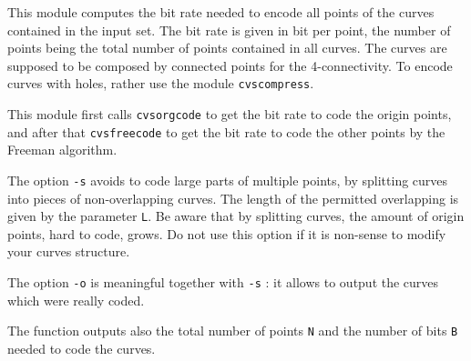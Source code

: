 This module computes the bit rate needed to encode
all points of the curves contained in the input set.
The bit rate is given in bit per point, the number of points being
the total number of points contained in all curves.
The curves are supposed to be composed by connected points
for the 4-connectivity. To encode curves with holes, rather use
the module \verb+cvscompress+.

This module first calls \verb+cvsorgcode+ to get the 
bit rate to code the origin points, and after that
\verb+cvsfreecode+ to get the bit rate to code the other points
by the Freeman algorithm.

The option \verb+-s+ avoids to code large parts of multiple points,
by splitting curves into pieces of non-overlapping curves.
The length of the permitted overlapping is given by the parameter
\verb+L+. 
Be aware that by splitting curves, the amount of origin points,
hard to code, grows.
Do not use this option if it is non-sense to modify your curves 
structure.

The option \verb+-o+ is meaningful together with \verb+-s+ : it
allows to output the curves which were really coded.

The function outputs also the total number of points \verb+N+
and the number of bits \verb+B+ needed to code the curves.
